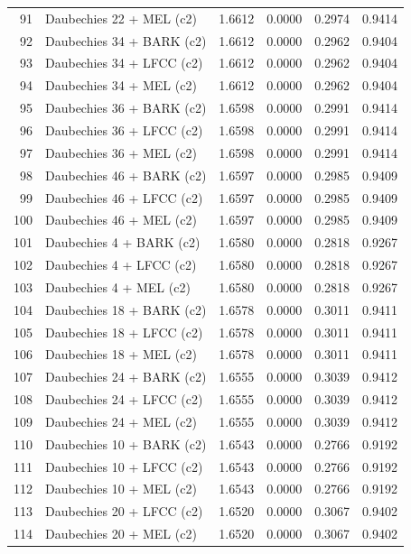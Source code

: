 \begin{longtable}{@{}rlrrrr@{}}
91 & Daubechies 22 + MEL (c2) & 1.6612 & 0.0000 & 0.2974 & 0.9414 \\
92 & Daubechies 34 + BARK (c2) & 1.6612 & 0.0000 & 0.2962 & 0.9404 \\
93 & Daubechies 34 + LFCC (c2) & 1.6612 & 0.0000 & 0.2962 & 0.9404 \\
94 & Daubechies 34 + MEL (c2) & 1.6612 & 0.0000 & 0.2962 & 0.9404 \\
95 & Daubechies 36 + BARK (c2) & 1.6598 & 0.0000 & 0.2991 & 0.9414 \\
96 & Daubechies 36 + LFCC (c2) & 1.6598 & 0.0000 & 0.2991 & 0.9414 \\
97 & Daubechies 36 + MEL (c2) & 1.6598 & 0.0000 & 0.2991 & 0.9414 \\
98 & Daubechies 46 + BARK (c2) & 1.6597 & 0.0000 & 0.2985 & 0.9409 \\
99 & Daubechies 46 + LFCC (c2) & 1.6597 & 0.0000 & 0.2985 & 0.9409 \\
100 & Daubechies 46 + MEL (c2) & 1.6597 & 0.0000 & 0.2985 & 0.9409 \\
101 & Daubechies 4 + BARK (c2) & 1.6580 & 0.0000 & 0.2818 & 0.9267 \\
102 & Daubechies 4 + LFCC (c2) & 1.6580 & 0.0000 & 0.2818 & 0.9267 \\
103 & Daubechies 4 + MEL (c2) & 1.6580 & 0.0000 & 0.2818 & 0.9267 \\
104 & Daubechies 18 + BARK (c2) & 1.6578 & 0.0000 & 0.3011 & 0.9411 \\
105 & Daubechies 18 + LFCC (c2) & 1.6578 & 0.0000 & 0.3011 & 0.9411 \\
106 & Daubechies 18 + MEL (c2) & 1.6578 & 0.0000 & 0.3011 & 0.9411 \\
107 & Daubechies 24 + BARK (c2) & 1.6555 & 0.0000 & 0.3039 & 0.9412 \\
108 & Daubechies 24 + LFCC (c2) & 1.6555 & 0.0000 & 0.3039 & 0.9412 \\
109 & Daubechies 24 + MEL (c2) & 1.6555 & 0.0000 & 0.3039 & 0.9412 \\
110 & Daubechies 10 + BARK (c2) & 1.6543 & 0.0000 & 0.2766 & 0.9192 \\
111 & Daubechies 10 + LFCC (c2) & 1.6543 & 0.0000 & 0.2766 & 0.9192 \\
112 & Daubechies 10 + MEL (c2) & 1.6543 & 0.0000 & 0.2766 & 0.9192 \\
113 & Daubechies 20 + LFCC (c2) & 1.6520 & 0.0000 & 0.3067 & 0.9402 \\
114 & Daubechies 20 + MEL (c2) & 1.6520 & 0.0000 & 0.3067 & 0.9402 \\

\end{longtable}
